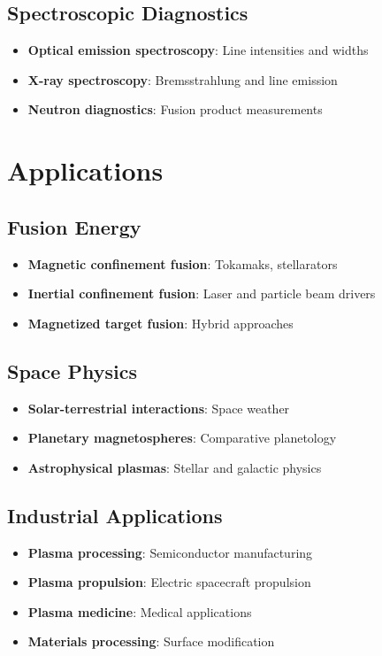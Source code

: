 \documentclass[11pt]{article}
\theoremstyle{definition}
\begin{document}
\subsection{Spectroscopic Diagnostics}
\begin{itemize}
    \item \textbf{Optical emission spectroscopy}: Line intensities and widths
    \item \textbf{X-ray spectroscopy}: Bremsstrahlung and line emission
    \item \textbf{Neutron diagnostics}: Fusion product measurements
\end{itemize}

\section{Applications}

\subsection{Fusion Energy}
\begin{itemize}
    \item \textbf{Magnetic confinement fusion}: Tokamaks, stellarators
    \item \textbf{Inertial confinement fusion}: Laser and particle beam drivers
    \item \textbf{Magnetized target fusion}: Hybrid approaches
\end{itemize}

\subsection{Space Physics}
\begin{itemize}
    \item \textbf{Solar-terrestrial interactions}: Space weather
    \item \textbf{Planetary magnetospheres}: Comparative planetology
    \item \textbf{Astrophysical plasmas}: Stellar and galactic physics
\end{itemize}

\subsection{Industrial Applications}
\begin{itemize}
    \item \textbf{Plasma processing}: Semiconductor manufacturing
    \item \textbf{Plasma propulsion}: Electric spacecraft propulsion
    \item \textbf{Plasma medicine}: Medical applications
    \item \textbf{Materials processing}: Surface modification
\end{itemize}
\end{document}
